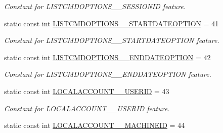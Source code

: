\begin{DoxyCompactItemize}
\begin{DoxyCompactList}\small\item\em Constant for LISTCMDOPTIONS\_\-\_\-SESSIONID feature. \item\end{DoxyCompactList}\item 
\hypertarget{classUMS__Data_1_1UMS__DataPackage_a93dbc3bbb73a493edb928d8b7c93d8a5}{
static const int \hyperlink{classUMS__Data_1_1UMS__DataPackage_a93dbc3bbb73a493edb928d8b7c93d8a5}{LISTCMDOPTIONS\_\-\_\-STARTDATEOPTION} = 41}
\label{classUMS__Data_1_1UMS__DataPackage_a93dbc3bbb73a493edb928d8b7c93d8a5}

\begin{DoxyCompactList}\small\item\em Constant for LISTCMDOPTIONS\_\-\_\-STARTDATEOPTION feature. \item\end{DoxyCompactList}\item 
\hypertarget{classUMS__Data_1_1UMS__DataPackage_acf61d7553b36dbac13915d62862fc92d}{
static const int \hyperlink{classUMS__Data_1_1UMS__DataPackage_acf61d7553b36dbac13915d62862fc92d}{LISTCMDOPTIONS\_\-\_\-ENDDATEOPTION} = 42}
\label{classUMS__Data_1_1UMS__DataPackage_acf61d7553b36dbac13915d62862fc92d}

\begin{DoxyCompactList}\small\item\em Constant for LISTCMDOPTIONS\_\-\_\-ENDDATEOPTION feature. \item\end{DoxyCompactList}\item 
\hypertarget{classUMS__Data_1_1UMS__DataPackage_a2d2f64a65697e2dc296ad39b8f9080b2}{
static const int \hyperlink{classUMS__Data_1_1UMS__DataPackage_a2d2f64a65697e2dc296ad39b8f9080b2}{LOCALACCOUNT\_\-\_\-USERID} = 43}
\label{classUMS__Data_1_1UMS__DataPackage_a2d2f64a65697e2dc296ad39b8f9080b2}

\begin{DoxyCompactList}\small\item\em Constant for LOCALACCOUNT\_\-\_\-USERID feature. \item\end{DoxyCompactList}\item 
\hypertarget{classUMS__Data_1_1UMS__DataPackage_a3bc3f1e7cfebdb165d565cede5b6b65f}{
static const int \hyperlink{classUMS__Data_1_1UMS__DataPackage_a3bc3f1e7cfebdb165d565cede5b6b65f}{LOCALACCOUNT\_\-\_\-MACHINEID} = 44}
\label{classUMS__Data_1_1UMS__DataPackage_a3bc3f1e7cfebdb165d565cede5b6b65f}


\end{DoxyCompactItemize}
